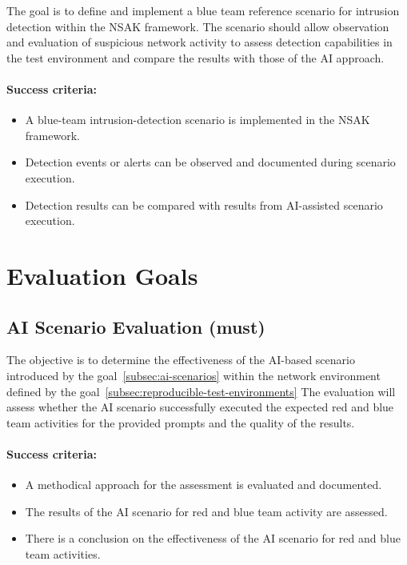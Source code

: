 The goal is to define and implement a blue team reference scenario for intrusion detection within the \gls{NSAK} framework.
The scenario should allow observation and evaluation of suspicious network activity to assess detection capabilities in the test environment and compare the results with those of the \gls{AI} approach.

\paragraph{Success criteria:}

\begin{itemize}
	\item A blue-team intrusion-detection scenario is implemented in the \gls{NSAK} framework.
	\item Detection events or alerts can be observed and documented during scenario execution.
	\item Detection results can be compared with results from \gls{AI}-assisted scenario execution.
\end{itemize}
\newpage

\section{Evaluation Goals}\label{sec:evaluation-goals}

\subsection{\gls{AI} Scenario Evaluation (must)}\label{subsec:ai-scenario-evaluation}

The objective is to determine the effectiveness of the \gls{AI}-based scenario introduced by the goal~\ref{subsec:ai-scenarios} within the network environment defined by the goal~\ref{subsec:reproducible-test-environments}
The evaluation will assess whether the \gls{AI} scenario successfully executed the expected red and blue team activities for the provided prompts and the quality of the results.

\paragraph{Success criteria:}

\begin{itemize}
	\item A methodical approach for the assessment is evaluated and documented.
	\item The results of the \gls{AI} scenario for red and blue team activity are assessed.
	\item There is a conclusion on the effectiveness of the \gls{AI} scenario for red and blue team activities.
\end{itemize}


